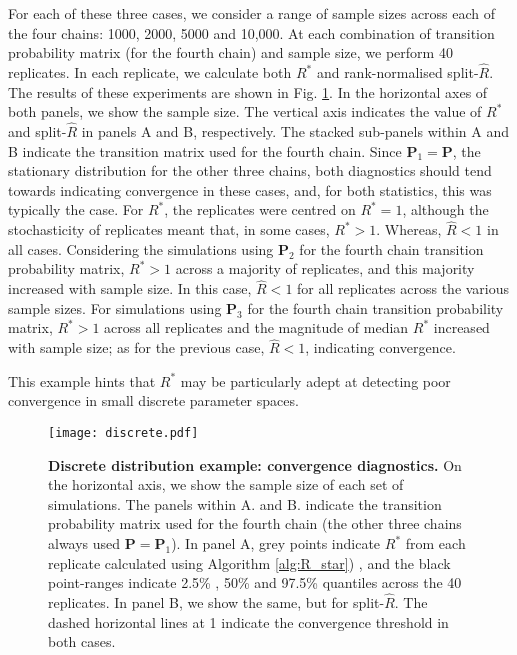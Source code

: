 \documentclass{article}
\begin{document}
For each of these three cases, we consider a range of sample sizes across each of the four chains: 1000, 2000, 5000 and 10,000. At each combination of transition probability matrix (for the fourth chain) and sample size, we perform 40 replicates. In each replicate, we calculate both $R^*$ and rank-normalised split-$\widehat{R}$. The results of these experiments are shown in Fig. \ref{fig:discrete}. In the horizontal axes of both panels, we show the sample size. The vertical axis indicates the value of $R^*$ and split-$\widehat{R}$ in panels A and B, respectively. The stacked sub-panels within A and B indicate the transition matrix used for the fourth chain. Since $\boldsymbol{P}_1=\boldsymbol{P}$, the stationary distribution for the other three chains, both diagnostics should tend towards indicating convergence in these cases, and, for both statistics, this was typically the case. For $R^*$, the replicates were centred on $R^*=1$, although the stochasticity of replicates meant that, in some cases, $R^*>1$. Whereas, $\widehat{R}<1$ in all cases. Considering the simulations using $\boldsymbol{P}_2$ for the fourth chain transition probability matrix, $R^*>1$ across a majority of replicates, and this majority increased with sample size. In this case, $\widehat{R}<1$ for all replicates across the various sample sizes. For simulations using $\boldsymbol{P}_3$ for the fourth chain transition probability matrix, $R^*>1$ across all replicates and the magnitude of median $R^*$ increased with sample size; as for the previous case, $\widehat{R}<1$, indicating convergence.

This example hints that $R^*$ may be particularly adept at detecting poor convergence in small discrete parameter spaces.


\begin{figure}[!htb]
	\centerline{\texttt{[image: discrete.pdf]}}
	\caption{\textbf{Discrete distribution example: convergence diagnostics.} On the horizontal axis, we show the sample size of each set of simulations. The panels within A. and B. indicate the transition probability matrix used for the fourth chain (the other three chains always used $\boldsymbol{P}=\boldsymbol{P}_1$). In panel A, grey points indicate $R^*$ from each replicate calculated using Algorithm \ref{alg:R_star}) , and the black point-ranges indicate 2.5\% , 50\% and 97.5\% quantiles across the 40 replicates. In panel B, we show the same, but for split-$\widehat{R}$. The dashed horizontal lines at 1 indicate the convergence threshold in both cases.}
	\label{fig:discrete}
\end{figure}
\end{document}
